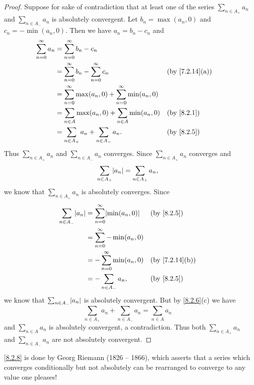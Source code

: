 \begin{proof}
  Suppose for sake of contradiction that at least one of the series \(\sum_{n \in A_+} a_n\) and \(\sum_{n \in A_-} a_n\) is absolutely convergent.
  Let \(b_n = \max(a_n, 0)\) and \(c_n = -\min(a_n, 0)\).
  Then we have \(a_n = b_n - c_n\) and
  \begin{align*}
    \sum_{n = 0}^\infty a_n & = \sum_{n = 0}^\infty b_n - c_n                                                                         \\
                            & = \sum_{n = 0}^\infty b_n - \sum_{n = 0}^\infty c_n                   &  & \text{(by \cref{7.2.14}(a))} \\
                            & = \sum_{n = 0}^\infty \max(a_n, 0) + \sum_{n = 0}^\infty \min(a_n, 0)                                   \\
                            & = \sum_{n \in A} \max(a_n, 0) + \sum_{n \in A} \min(a_n, 0)           &  & \by{8.2.1}                   \\
                            & = \sum_{n \in A_+} a_n + \sum_{n \in A_-} a_n.                        &  & \by{8.2.5}
  \end{align*}
  Thus \(\sum_{n \in A_+} a_n\) and \(\sum_{n \in A_-} a_n\) converges.
  Since \(\sum_{n \in A_+} a_n\) converges and
  \[
    \sum_{n \in A_+} \abs{a_n} = \sum_{n \in A_+} a_n,
  \]
  we know that \(\sum_{n \in A_+} a_n\) is absolutely converges.
  Since
  \begin{align*}
    \sum_{n \in A_-} \abs{a_n} & = \sum_{n = 0}^\infty \abs{\min(a_n, 0)} &  & \by{8.2.5}                   \\
                               & = \sum_{n = 0}^\infty -\min(a_n, 0)                                        \\
                               & = -\sum_{n = 0}^\infty \min(a_n, 0)      &  & \text{(by \cref{7.2.14}(b))} \\
                               & = -\sum_{n \in A_-} a_n,                 &  & \by{8.2.5}
  \end{align*}
  we know that \(\sum_{n \in A_-} \abs{a_n}\) is absolutely convergent.
  But by \cref{8.2.6}(c) we have
  \[
    \sum_{n \in A_+} a_n + \sum_{n \in A_-} a_n = \sum_{n \in A} a_n
  \]
  and \(\sum_{n \in A} a_n\) is absolutely convergent, a contradiction.
  Thus both \(\sum_{n \in A_+} a_n\) and \(\sum_{n \in A_-} a_n\) are not absolutely convergent.
\end{proof}

\begin{note}
  \cref{8.2.8} is done by Georg Riemann (1826 -- 1866), which asserts that a series which converges conditionally but not absolutely can be rearranged to converge to any value one pleases!
\end{note}


